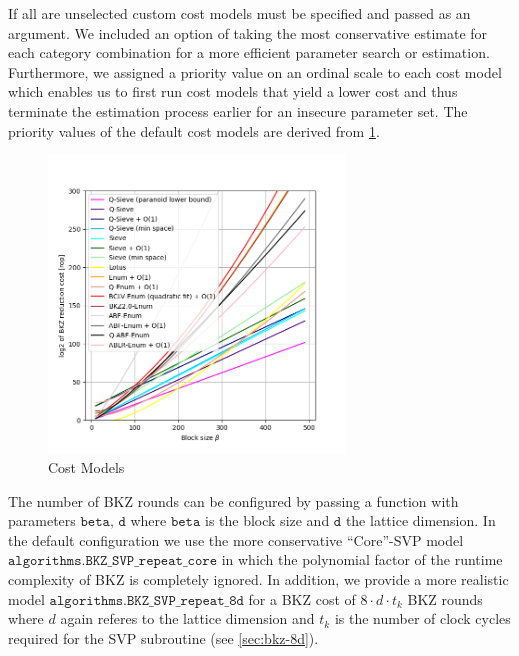 If all are unselected custom cost models must be specified and passed as an argument. We included an option of taking the most conservative estimate for each category combination for a more efficient parameter search or estimation. Furthermore, we assigned a priority value on an ordinal scale to each cost model which enables us to first run cost models that yield a lower cost and thus terminate the estimation process earlier for an insecure parameter set. The priority values of the default cost models are derived from \cref{fig:costmodels}.
\begin{figure}[h]
    \centering
    \includegraphics[width=0.7\textwidth]{graphics/cost_models.png}
    \caption{Cost Models}\label{fig:costmodels}
\end{figure}
The number of BKZ rounds can be configured by passing a function with parameters $\texttt{beta, d}$ where $\texttt{beta}$ is the block size and $\texttt{d}$ the lattice dimension. In the default configuration we use the more conservative ``Core''-SVP model $\texttt{algorithms.BKZ\_SVP\_repeat\_core}$ \cite{ADPS16} in which the polynomial factor of the runtime complexity of BKZ is completely ignored. In addition, we provide a more realistic model $\texttt{algorithms.BKZ\_SVP\_repeat\_8d}$ for a BKZ cost of $8 \cdot d \cdot t_k$ BKZ rounds where $d$ again referes to the lattice dimension and $t_k$ is the number of clock cycles required for the SVP subroutine (see \cref{sec:bkz-8d}). %


